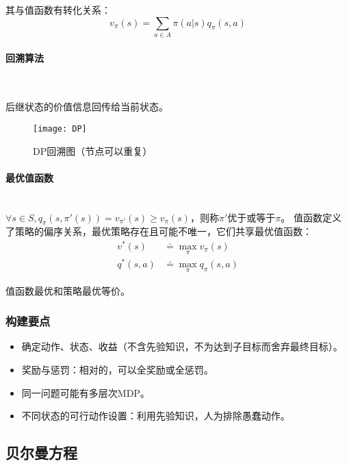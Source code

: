 \documentclass[
12pt, %
a4paper, 
oneside, %
headinclude,footinclude, %
]{scrartcl}
\begin{document}
其与值函数有转化关系：
$$ v_\pi(s) = \sum_{a \in A} \pi(a|s) q_\pi(s, a) $$
\paragraph{回溯算法}~\\
\begin{minipage}{0.3\textwidth}
\hspace{2em}
后继状态的价值信息回传给当前状态。
\end{minipage}
\hfill
\begin{minipage}{0.6\textwidth}
\begin{figure}[H]
\centering 
\texttt{[image: DP]} 
\caption[DP回溯图]{DP回溯图（节点可以重复）}
\end{figure}
\end{minipage}
\paragraph{最优值函数}~\\

$ \forall s \in S, q_{\pi}(s, \pi'(s)) = v_{\pi'}(s) \geq v_{\pi}(s) $，则称$ \pi' $优于或等于$ \pi $。
值函数定义了策略的偏序关系，最优策略存在且可能不唯一，它们共享最优值函数：
\begin{align*}
v^*(s) &\doteq \max_{\pi} v_{\pi}(s) \\
q^*(s, a) &\doteq \max_{\pi} q_{\pi}(s, a) 
\end{align*}

值函数最优和策略最优等价。
\subsubsection[构建要点]{构建要点}
\begin{itemize}
\item 确定动作、状态、收益（不含先验知识，不为达到子目标而舍弃最终目标）。
\item 奖励与惩罚：相对的，可以全奖励或全惩罚。
\item 同一问题可能有多层次MDP。
\item 不同状态的可行动作设置：利用先验知识，人为排除愚蠢动作。
\end{itemize}
\subsection[贝尔曼方程]{贝尔曼方程}
\end{document}
